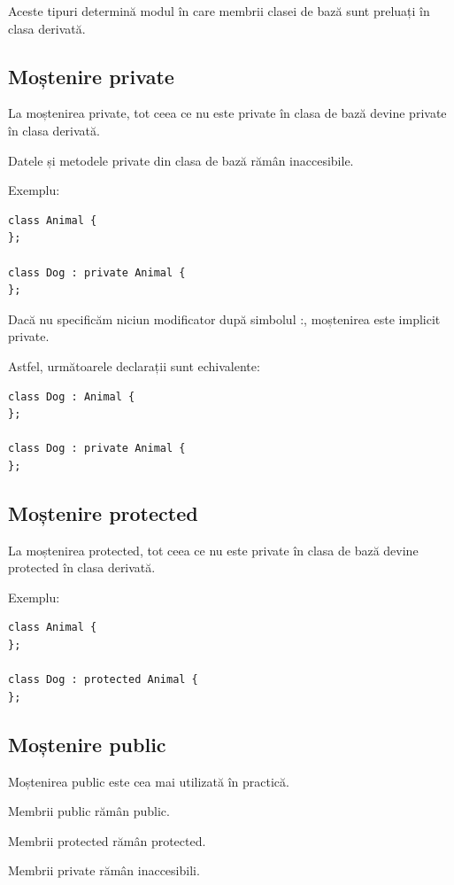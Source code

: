 \documentclass[12pt,a4paper]{article}
\begin{document}
Aceste tipuri determină modul în care membrii clasei de bază sunt preluați în clasa derivată.

\subsection{Moștenire private}

La moștenirea private, tot ceea ce nu este private în clasa de bază devine private în clasa derivată.

Datele și metodele private din clasa de bază rămân inaccesibile.

Exemplu:

\begin{verbatim}
class Animal {
};

class Dog : private Animal {
};
\end{verbatim}

Dacă nu specificăm niciun modificator după simbolul :, moștenirea este implicit private.

Astfel, următoarele declarații sunt echivalente:

\begin{verbatim}
class Dog : Animal {
};

class Dog : private Animal {
};
\end{verbatim}

\subsection{Moștenire protected}

La moștenirea protected, tot ceea ce nu este private în clasa de bază devine protected în clasa derivată.

Exemplu:

\begin{verbatim}
class Animal {
};

class Dog : protected Animal {
};
\end{verbatim}

\subsection{Moștenire public}

Moștenirea public este cea mai utilizată în practică.

Membrii public rămân public.

Membrii protected rămân protected.

Membrii private rămân inaccesibili.
\end{document}
